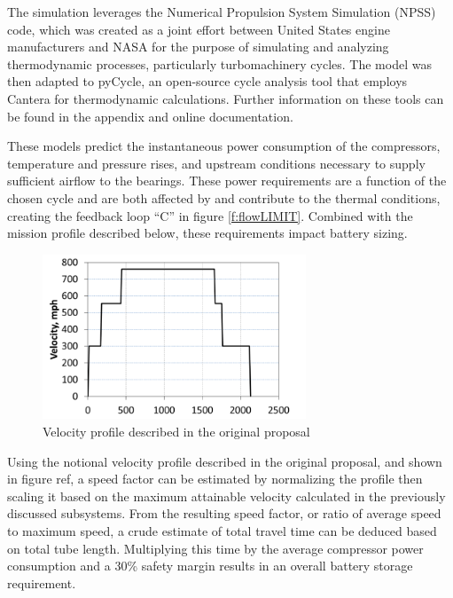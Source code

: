 \documentclass[heading.tex]{subfiles}
\begin{document}
The simulation leverages the Numerical Propulsion System Simulation (NPSS) code, which
was created as a joint effort between United States engine manufacturers and NASA
for the purpose of simulating and analyzing thermodynamic processes, particularly turbomachinery cycles. \cite{Lytle}
The model was then adapted to pyCycle, an open-source cycle analysis tool that employs Cantera for thermodynamic calculations.
Further information on these tools can be found in the appendix and online documentation. \cite{goodwin2009cantera}

These models predict the instantaneous power consumption of the compressors, temperature and pressure rises,
and upstream conditions necessary to supply sufficient airflow to the bearings.
These power requirements are a function of the chosen cycle and are both affected by
and contribute to the thermal conditions, creating the feedback loop “C” in figure \ref{f:flowLIMIT}.
Combined with the mission profile described below, these requirements impact battery sizing.

\begin{figure}[hbtp]
\centering
\includegraphics[width=0.7\textwidth]{images/velocity_profile.png}
\caption{Velocity profile described in the original proposal}
\label{f:velocity}
\end{figure}

Using the notional velocity profile described in the original proposal, and shown in figure {ref},
a speed factor can be estimated by normalizing the profile then scaling it based on the maximum
attainable velocity calculated in the previously discussed subsystems.
From the resulting speed factor, or ratio of average speed to maximum speed,
a crude estimate of total travel time can be deduced based on total tube length.
Multiplying this time by the average compressor power consumption and a 30\% safety margin results in an overall battery storage requirement.
\end{document}
